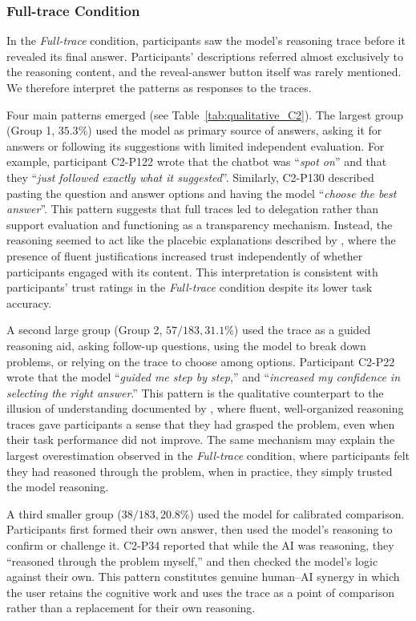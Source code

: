 \documentclass[manuscript, anonymous=false,authorversion,review=false]{acmart}
\begin{document}
\subsubsection{Full-trace Condition}


In the \textit{Full-trace} condition, participants saw the model's reasoning trace before it revealed its final answer. Participants' descriptions referred almost exclusively to the reasoning content, and the reveal-answer button itself was rarely mentioned. We therefore interpret the patterns as responses to the traces.


Four main patterns emerged (see Table~\ref{tab:qualitative_C2}).
The largest group (Group 1, $35.3\%$) used the model as primary source of answers, asking it for answers or following its suggestions with limited independent evaluation. For example, participant C2-P122 wrote that the chatbot was ``\textit{spot on}'' and that they ``\textit{just followed exactly what it suggested}''. Similarly, C2-P130 described pasting the question and answer options and having the model ``\textit{choose the best answer}''. This pattern suggests that full traces led to delegation rather than support evaluation and functioning as a transparency mechanism. Instead, the reasoning seemed to act like the placebic explanations described by \citet{eiband2019impact}, where the presence of fluent justifications increased trust independently of whether participants engaged with its content. This interpretation is consistent with participants' trust ratings in the \textit{Full-trace} condition despite its lower task accuracy.


A second large group (Group 2, $57/183, 31.1\%$) used the trace as a guided reasoning aid, asking follow-up questions, using the model to break down problems, or relying on the trace to choose among options. Participant C2-P22 wrote that the model ``\textit{guided me step by step},'' and ``\textit{increased my confidence in selecting the right answer}.''
This pattern is the qualitative counterpart to the illusion of understanding documented by \citet{fisher2021harder}, where fluent, well-organized reasoning traces gave participants a sense that they had grasped the problem, even when their task performance did not improve. The same mechanism may explain the largest overestimation observed in the \textit{Full-trace} condition, where participants felt they had reasoned through the problem, when in practice, they simply trusted the model reasoning.


A third smaller group ($38/183, 20.8\%$) used the model for calibrated comparison. Participants first formed their own answer, then used the model's reasoning to confirm or challenge it. C2-P34 reported that while the AI was reasoning, they ``reasoned through the problem myself,'' and then checked the model’s logic against their own.
This pattern constitutes genuine human–AI synergy \cite{vaccaro2024combinations} in which the user retains the cognitive work and uses the trace as a point of comparison rather than a replacement for their own reasoning.
\end{document}
